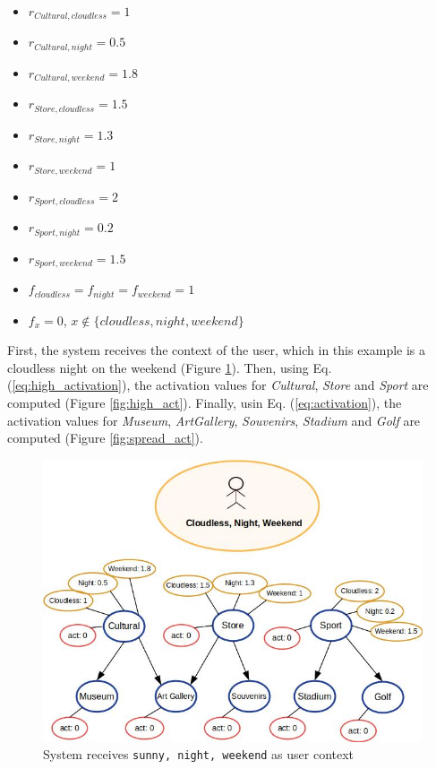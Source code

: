 \begin{itemize}
    \item $r_{Cultural, cloudless} = 1$
    \item $r_{Cultural, night} = 0.5$
    \item $r_{Cultural, weekend} = 1.8$
    \item $r_{Store, cloudless} = 1.5$
    \item $r_{Store, night} = 1.3$
    \item $r_{Store, weekend} = 1$
    \item $r_{Sport, cloudless} = 2$
    \item $r_{Sport, night} = 0.2$
    \item $r_{Sport, weekend} = 1.5$
    \item $f_{cloudless} = f_{night} = f_{weekend} = 1$
    \item $f_x = 0$, $x \notin \{cloudless, night, weekend\}$
\end{itemize}

First, the system receives the context of the user, which in this example is a cloudless night on the weekend (Figure \ref{fig:init_act}). Then, using Eq. (\ref{eq:high_activation}), the activation values for \textit{Cultural}, \textit{Store} and \textit{Sport} are computed (Figure \ref{fig:high_act}). Finally, usin Eq. (\ref{eq:activation}), the activation values for \textit{Museum}, \textit{ArtGallery}, \textit{Souvenirs}, \textit{Stadium} and \textit{Golf} are computed (Figure \ref{fig:spread_act}).

\begin{figure}[h]
\centering
\includegraphics[scale=0.45]{draws/initial_act.jpg}
\caption{System receives {\tt sunny, night, weekend} as user context}
\label{fig:init_act}
\end{figure}


